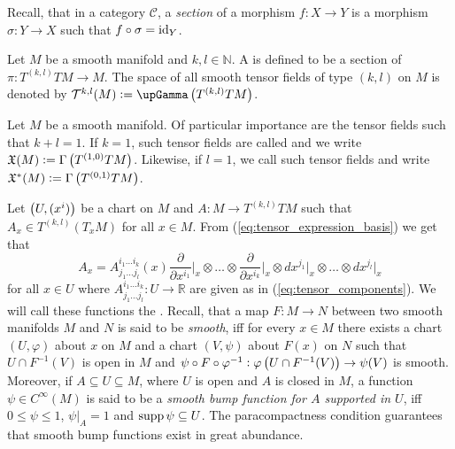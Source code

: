 Recall, that in a category $\mathcal{C}$, a \emph{section} of a morphism $f : X \to Y$ is a morphism $\sigma : Y \to X$ such that $f \circ \sigma = \operatorname{id}_Y$.

\begin{definition}
	Let $M$ be a smooth manifold and $k,l \in \mathbb{N}$. A  is defined to be a section of $\pi : T^{(k,l)}TM \to M$. The space of all smooth tensor fields of type $(k,l)$ on $M$ is denoted by $\mathcal{T}^{k,l}(M) := \upGamma\del[1]{T^{(k,l)}TM}$.
\end{definition}

\begin{example}
	\label{ex:vector_and_covector_fields}
	Let $M$ be a smooth manifold. Of particular importance are the tensor fields such that $k + l = 1$. If $k = 1$, such tensor fields are called  and we write $\mathfrak{X}(M) := \Gamma\del[1]{T^{(1,0)}TM}$. Likewise, if $l = 1$, we call such tensor fields  and write $\mathfrak{X}^*(M) := \Gamma\del[1]{T^{(0,1)}TM}$.
\end{example}

Let $\del[1]{U,(x^i)}$ be a chart on $M$ and $A : M \to T^{(k,l)}TM$ such that $A_x \in T^{(k,l)}(T_xM)$ for all $x \in M$. From (\ref{eq:tensor_expression_basis}) we get that
\begin{equation*}
	A_x = A^{i_1\dots i_k}_{j_1\dots j_l}(x)\frac{\partial}{\partial x^{i_1}}\bigg\vert_x \otimes \dots \otimes \frac{\partial}{\partial x^{i_k}}\bigg\vert_x \otimes dx^{j_1}\vert_x \otimes \dots \otimes dx^{j_l}\vert_x
\end{equation*}
\noindent for all $x \in U$ where $A^{i_1\dots i_k}_{j_1\dots j_l} : U \to \mathbb{R}$ are given as in (\ref{eq:tensor_components}). We will call these functions the . Recall, that a map $F : M \to N$ between two smooth manifolds $M$ and $N$ is said to be \emph{smooth}, iff for every $x \in M$ there exists a chart $(U,\varphi)$ about $x$ on $M$ and a chart $(V,\psi)$ about $F(x)$ on $N$ such that $U \cap F^{-1}(V)$ is open in $M$ and $\psi \circ F \circ \varphi^{-1} : \varphi\del[1]{U \cap F^{-1}(V)} \to \psi(V)$ is smooth. Moreover, if $A \subseteq U \subseteq M$, where $U$ is open and $A$ is closed in $M$, a function $\psi \in C^\infty(M)$ is said to be a \emph{smooth bump function for $A$ supported in $U$}, iff $0 \leq \psi \leq 1$, $\psi \vert_A = 1$ and $\operatorname{supp} \psi \subseteq U$. The paracompactness condition guarantees that smooth bump functions exist in great abundance.

